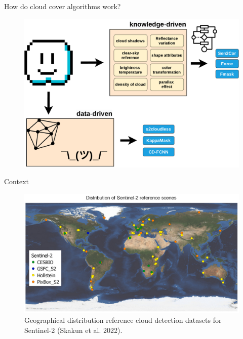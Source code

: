 \begin{frame}{How do cloud cover algorithms work?}
	\begin{center}
		\begin{figure}
			\centering
			\includegraphics[width=0.85\linewidth]{images/intro_what_is_a_cloud.pdf}
			\label{fig:introfig01}
		\end{figure}
	\end{center}
\end{frame}


\begin{frame}{Context}
	\begin{center}
		\begin{figure}
			\centering
			\includegraphics[width=0.85\linewidth]{images/intro_fig01.png}
			\caption[fig:introfig01]{Geographical distribution reference cloud detection datasets for Sentinel-2 (Skakun et al. 2022).}
			\label{fig:introfig01}
		\end{figure}
	\end{center}
\end{frame}
